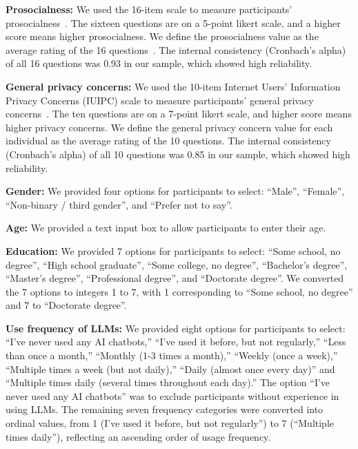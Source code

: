 \textbf{Prosocialness:}
We used the 16-item scale to measure participants’ prosocialness~\cite{caprara2005new}. 
The sixteen questions are on a 5-point likert scale, and a higher score means higher prosocialness. 
We define the prosocialness value as the average rating of the 16 questions~\cite{caprara2005new}. 
The internal consistency (Cronbach’s alpha) of all 16 questions was 0.93 in our sample, which showed high reliability.

\textbf{General privacy concerns:}
We used the 10-item Internet Users’ Information Privacy Concerns (IUIPC) scale to measure participants’ general privacy concerns~\cite{malhotra2004internet}. 
The ten questions are on a 7-point likert scale, and higher score means higher privacy concerns. 
We define the general privacy concern value for each individual as the average rating of the 10 questions. 
The internal consistency (Cronbach’s alpha) of all 10 questions was 0.85 in our sample, which showed high reliability.

\textbf{Gender:}
We provided four options for participants to select: ``Male'', ``Female'', ``Non-binary / third gender'', and ``Prefer not to say''.

\textbf{Age:} 
We provided a text input box to allow participants to enter their age.

\textbf{Education:}
We provided 7 options for participants to select: ``Some school, no degree'', ``High school graduate'', ``Some college, no degree'', ``Bachelor's degree'', ``Master's degree'', ``Professional degree'', and ``Doctorate degree''.
We converted the 7 options to integers 1 to 7, with 1 corresponding to ``Some school, no degree'' and 7 to ``Doctorate degree''.

\textbf{Use frequency of LLMs:} \label{sec: using-frequency-question}
We provided eight options for participants to select: ``I've never used any AI chatbots,'' ``I've used it before, but not regularly,'' ``Less than once a month,'' ``Monthly (1-3 times a month),'' ``Weekly (once a week),'' ``Multiple times a week (but not daily),'' ``Daily (almost once every day)'' and ``Multiple times daily (several times throughout each day).''
The option ``I've never used any AI chatbots'' was to exclude participants without experience in using LLMs.
The remaining seven frequency categories were converted into ordinal values, from 1 (I've used it before, but not regularly'') to 7 (``Multiple times daily''), reflecting an ascending order of usage frequency.



